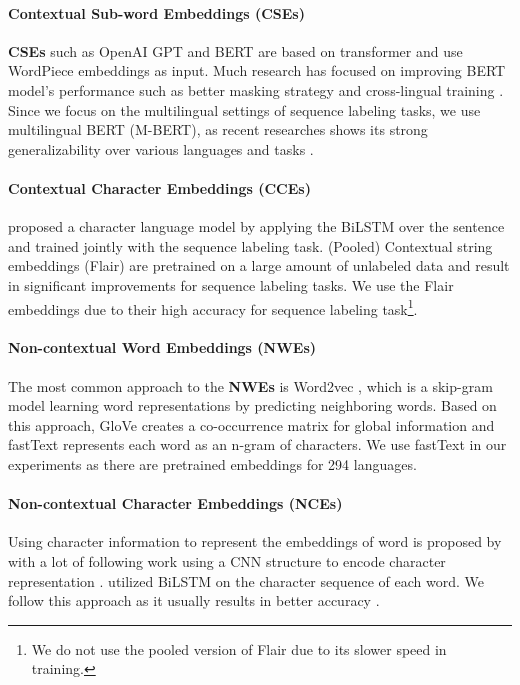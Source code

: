 \documentclass[11pt,a4paper]{article}
\begin{document}
\paragraph{Contextual Sub-word Embeddings (CSEs)} 
\textbf{CSEs} such as OpenAI GPT \cite{radford2018improving} and BERT \cite{devlin-etal-2019-bert} are based on transformer \cite{vaswani2017attention} and use WordPiece embeddings \cite{sennrich-etal-2016-neural,wu2016google} as input.
Much research has focused on improving BERT model's performance such as better masking strategy \cite{liu2019roberta} and cross-lingual training \cite{conneau2019cross}. 
Since we focus on the multilingual settings of sequence labeling tasks, we use multilingual BERT (M-BERT), as recent researches shows its strong generalizability over various languages and tasks \cite{pires-etal-2019-multilingual,karthikeyan2020cross}.

\paragraph{Contextual Character Embeddings (CCEs)} 
\citet{liu2018empower} proposed a character language model by applying the BiLSTM over the sentence and trained jointly with the sequence labeling task. (Pooled) Contextual string embeddings (Flair) \cite{akbik-etal-2018-contextual,akbik-etal-2019-pooled} are pretrained on a large amount of unlabeled data and result in significant improvements for sequence labeling tasks. We use the Flair embeddings due to their high accuracy for sequence labeling task\footnote{We do not use the pooled version of Flair due to its slower speed in training.}.


\paragraph{Non-contextual Word Embeddings (NWEs)} The most common approach to the \textbf{NWEs} is Word2vec \cite{mikolov2013distributed}, which is a skip-gram model learning word representations by predicting neighboring words. Based on this approach, GloVe \cite{pennington2014glove} creates a co-occurrence matrix for global information and fastText \cite{bojanowski2017enriching} represents each word as an n-gram of characters. We use fastText in our experiments as there are pretrained embeddings for 294 languages.

\paragraph{Non-contextual Character Embeddings (NCEs)} 
Using character information to represent the embeddings of word is proposed by \citet{santos2014learning} with a lot of following work using a CNN structure to encode character representation \cite{dos-santos-guimaraes-2015-boosting,chiu-nichols-2016-named,ma-hovy-2016-end}. \citet{lample-etal-2016-neural} utilized BiLSTM on the character sequence of each word. We follow this approach as it usually results in better accuracy \cite{yang-etal-2018-design}.
\end{document}
